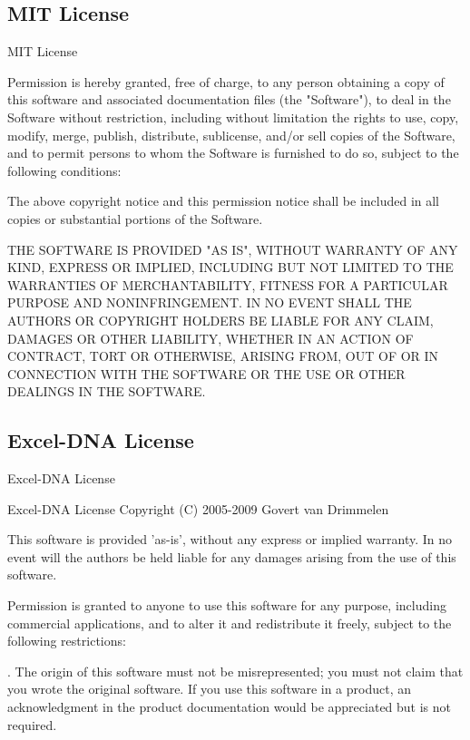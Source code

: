 \newpage
\subsection{MIT License}
\label{MITLicense}
\begin{center}
	MIT License
\end{center}

Permission is hereby granted, free of charge, to any person obtaining a copy of this software and associated documentation files (the "Software"), to deal in the Software without restriction, including without limitation the rights to use, copy, modify, merge, publish, distribute, sublicense, and/or sell copies of the Software, and to permit persons to whom the Software is furnished to do so, subject to the following conditions:

\vparasmall
The above copyright notice and this permission notice shall be included in all copies or substantial portions of the Software.

\vparasmall
THE SOFTWARE IS PROVIDED "AS IS", WITHOUT WARRANTY OF ANY KIND, EXPRESS OR IMPLIED, INCLUDING BUT NOT LIMITED TO THE WARRANTIES OF MERCHANTABILITY, FITNESS FOR A PARTICULAR PURPOSE AND NONINFRINGEMENT. IN NO EVENT SHALL THE AUTHORS OR COPYRIGHT HOLDERS BE LIABLE FOR ANY CLAIM, DAMAGES OR OTHER LIABILITY, WHETHER IN AN ACTION OF CONTRACT, TORT OR OTHERWISE, ARISING FROM, OUT OF OR IN CONNECTION WITH THE SOFTWARE OR THE USE OR OTHER DEALINGS IN THE SOFTWARE.





\newpage
\subsection{Excel-DNA License}
\label{ExcelDNALicense}
\begin{center}
	Excel-DNA License
\end{center}

Excel-DNA License
Copyright (C) 2005-2009 Govert van Drimmelen

This software is provided 'as-is', without any express or implied
warranty. In no event will the authors be held liable for any damages
arising from the use of this software.

\vparasmall
Permission is granted to anyone to use this software for any purpose,
including commercial applications, and to alter it and redistribute it
freely, subject to the following restrictions:

. The origin of this software must not be misrepresented; you must not
claim that you wrote the original software. If you use this software
in a product, an acknowledgment in the product documentation would be
appreciated but is not required.


